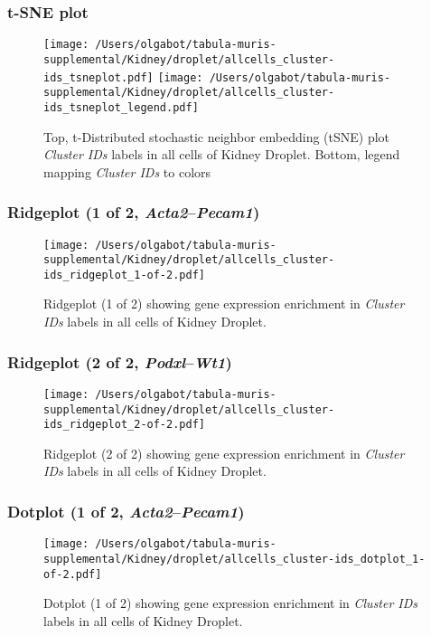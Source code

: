 \clearpage
\subsubsection{t-SNE plot}
\begin{figure}[h]
\centering
\texttt{[image: /Users/olgabot/tabula-muris-supplemental/Kidney/droplet/allcells\_cluster-ids\_tsneplot.pdf]}
\texttt{[image: /Users/olgabot/tabula-muris-supplemental/Kidney/droplet/allcells\_cluster-ids\_tsneplot\_legend.pdf]}
\caption{Top, t-Distributed stochastic neighbor embedding (tSNE) plot  \emph{Cluster IDs} labels in all cells of Kidney Droplet. Bottom, legend mapping \emph{Cluster IDs} to colors}
\end{figure}


\clearpage

\subsubsection{Ridgeplot (1 of 2, \emph{Acta2}--\emph{Pecam1})}
\begin{figure}[h]
\centering
\texttt{[image: /Users/olgabot/tabula-muris-supplemental/Kidney/droplet/allcells\_cluster-ids\_ridgeplot\_1-of-2.pdf]}

\caption{ Ridgeplot (1 of 2)  showing gene expression enrichment in \emph{Cluster IDs} labels in all cells of Kidney Droplet. }
\end{figure}


\clearpage

\subsubsection{Ridgeplot (2 of 2, \emph{Podxl}--\emph{Wt1})}
\begin{figure}[h]
\centering
\texttt{[image: /Users/olgabot/tabula-muris-supplemental/Kidney/droplet/allcells\_cluster-ids\_ridgeplot\_2-of-2.pdf]}

\caption{ Ridgeplot (2 of 2)  showing gene expression enrichment in \emph{Cluster IDs} labels in all cells of Kidney Droplet. }
\end{figure}


\clearpage

\subsubsection{Dotplot (1 of 2, \emph{Acta2}--\emph{Pecam1})}
\begin{figure}[h]
\centering
\texttt{[image: /Users/olgabot/tabula-muris-supplemental/Kidney/droplet/allcells\_cluster-ids\_dotplot\_1-of-2.pdf]}

\caption{ Dotplot (1 of 2)  showing gene expression enrichment in \emph{Cluster IDs} labels in all cells of Kidney Droplet. }
\end{figure}


